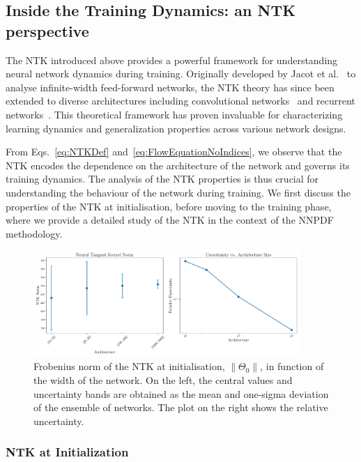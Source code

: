 \subsection{Inside the Training Dynamics: an NTK perspective}

The NTK introduced above provides a powerful framework for understanding neural
network dynamics during training. Originally developed by Jacot et
al.~\cite{jacot2018neural} to analyse infinite-width feed-forward networks, the
NTK theory has since been extended to diverse architectures including
convolutional networks~\cite{arora2019exact} and recurrent
networks~\cite{alemohammad2021recurrent}. This theoretical framework has proven
invaluable for characterizing learning dynamics and generalization properties
across various network designs.

From Eqs.~\eqref{eq:NTKDef} and~\eqref{eq:FlowEquationNoIndices}, we observe
that the NTK encodes the dependence on the architecture of the network and
governs its training dynamics. The analysis of the NTK properties is thus
crucial for understanding the behaviour of the network during training. We first
discuss the properties of the NTK at initialisation, before moving to the
training phase, where we provide a detailed study of the NTK in the context of
the NNPDF methodology.

\begin{figure}[t!]
  \centering
  \includegraphics[width=0.90\textwidth]{figs/section_3/ntk_initialization_with_uncertainty.pdf}
  \caption{Frobenius norm of the NTK at initialisation, $\lVert \Theta_0
  \rVert$, in function of the width of the network. On the left, the central
  values and uncertainty bands are obtained as the mean and one-sigma deviation
  of the ensemble of networks. The plot on the right shows the relative
  uncertainty.}
  \label{fig:NTKInit}
\end{figure}

\subsubsection{NTK at Initialization}
\label{sec:NTKAtInit}

